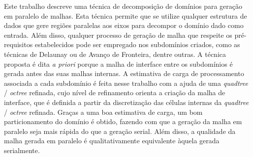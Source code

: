 \begin{resumo}

Este trabalho descreve uma técnica de decomposição de domínios para geração em paralelo de malhas. Esta técnica permite que se utilize qualquer estrutura de dados que gere regiões paralelas aos eixos para decompor o domínio dado como entrada. Além disso, qualquer processo de geração de malha que respeite os pré-requisitos estabelecidos pode ser empregado nos subdomínios criados, como as técnicas de Delaunay ou de Avanço de Fronteira, dentre outras. A técnica proposta é dita \textit{a priori} porque a malha de interface entre os subdomínios é gerada antes das suas malhas internas. A estimativa de carga de processamento associada a cada subdomínio é feita nesse trabalho com a ajuda de uma \textit{quadtree} / \textit{octree} refinada, cujo nível de refinamento orienta a criação da malha de interface, que é definida a partir da discretização das células internas da \textit{quadtree} / \textit{octree} refinada. Graças a uma boa estimativa de carga, um bom particionamento do domínio é obtido, fazendo com que a geração da malha em paralelo seja mais rápida do que a geração serial. Além disso, a qualidade da malha gerada em paralelo é qualitativamente equivalente àquela gerada serialmente. 


\palavraschave
\end{resumo}
\pagebreak
